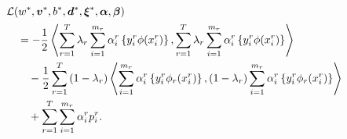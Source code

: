 \begin{equation}\nonumber
    \begin{aligned}
        & \mathcal{L}({{w}}^*, {\bm{v}}^*, {b}^*, {\bm{d}}^*, {\bm{\xi}}^*, \bm{\alpha}, \bm{\beta})\\
        &\quad= - \frac{1}{2} \bm{\left\langle}  \sum_{r= 1}^T  \lambda_r \sum_{i=1}^{m_r} {\alpha_i^r} \left\lbrace y_i^r \phi({x}_i^r) \right\rbrace,  \sum_{r= 1}^T \lambda_r \sum_{i=1}^{m_r} {\alpha_i^r} \left\lbrace y_i^r \phi({x}_i^r) \right\rbrace \bm{\right\rangle} \\
        &\qquad - \frac{1}{2} \sum_{r= 1}^T {(1-\lambda_r) \bm{\left\langle} \sum_{i=1}^{m_r} {\alpha_i^r} \left\lbrace y_i^r \phi_r({x}_i^r) \right\rbrace, (1-\lambda_r) \sum_{i=1}^{m_r} {\alpha_i^r} \left\lbrace y_i^r \phi_r({x}_i^r) \right\rbrace \bm{\right\rangle}} \\
        &\qquad +  \sum_{r= 1}^T \sum_{i=1}^{m_r} \alpha_i^r  p_{i}^r .
    \end{aligned}
\end{equation}
